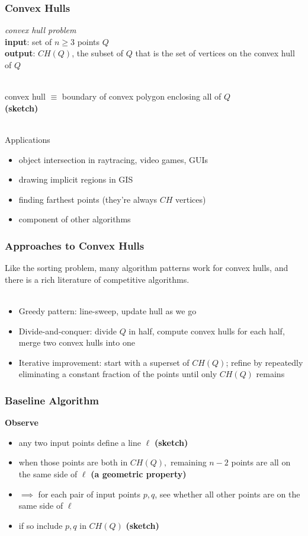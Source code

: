 \documentclass{beamer}
\newcommand{\stanza}{ \\~\ }
\begin{document}
\begin{frame} \frametitle{Convex Hulls}
\emph{convex hull problem} \\
\textbf{input}: set of $n \geq 3$ points $Q$ \\
\textbf{output}: $CH(Q)$, the subset of $Q$ that is the set of vertices on
  the convex hull of $Q$ \stanza

convex hull $\equiv$ boundary of convex polygon enclosing all of $Q$\\
 \textbf{(sketch)} \stanza

Applications
\begin{itemize}
  \item object intersection in raytracing, video games, GUIs
  \item drawing implicit regions in GIS
  \item finding farthest points (they're always $CH$ vertices)
  \item component of other algorithms
\end{itemize}
\end{frame}

\begin{frame} \frametitle{Approaches to Convex Hulls}
Like the sorting problem, many algorithm patterns work for convex hulls,
and there is a rich literature of competitive algorithms. \stanza

\begin{itemize}
  \item Greedy pattern: line-sweep, update hull as we go
  \item Divide-and-conquer: divide $Q$ in half, compute convex hulls for each
    half, merge two convex hulls into one
  \item Iterative improvement: start with a superset of $CH(Q)$; refine by repeatedly eliminating
    a constant fraction of the points until only $CH(Q)$ remains
\end{itemize}
\end{frame}

\begin{frame} \frametitle{Baseline Algorithm}
\textbf{Observe}
\begin{itemize}
  \item any two input points define a line $\ell$ \textbf{(sketch)}
  \item when those points are both in $CH(Q),$ remaining $n-2$ points are all on
    the same side of $\ell$ \textbf{(a geometric property)}
  \item $\implies$ for each pair of input points $p, q$, see whether all other points
    are on the same side of $\ell$
  \item if so include $p, q$ in $CH(Q)$ \textbf{(sketch)}
\end{itemize}
\end{frame}
\end{document}
